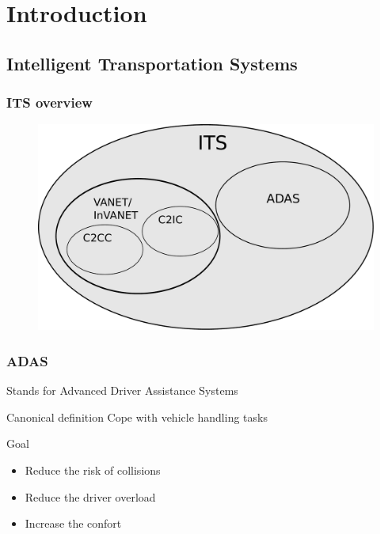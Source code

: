 \documentclass{beamer}
\begin{document}
\section{Introduction}

\subsection{Intelligent Transportation Systems}

	\begin{frame}
		\frametitle{ITS overview}
	
		\begin{figure}[h]
			\center
			\includegraphics[scale=0.3]{img/fig:its:division}
		 \end{figure}		
		
	\end{frame}

	\begin{frame}
		\frametitle{ADAS}
		\begin{exampleblock}{Stands for}	
			Advanced Driver Assistance Systems		
		\end{exampleblock}				
		\begin{block}{Canonical definition}
			Cope with vehicle handling tasks
		\end{block}		

		\begin{block}{Goal}
			\begin{itemize}
			\item Reduce the risk of collisions
			\item Reduce the driver overload
			\item Increase the confort
			\end{itemize}
		\end{block}
		
	\end{frame}
\end{document}
